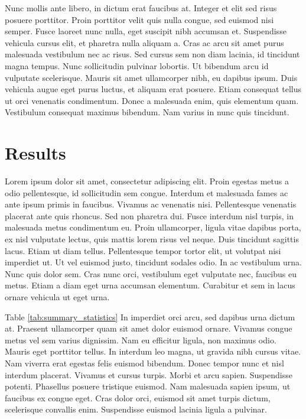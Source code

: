 \documentclass[12pt]{article}
\begin{document}
Nunc mollis ante libero, in dictum erat faucibus at. Integer et elit sed risus posuere porttitor. Proin porttitor velit quis nulla congue, sed euismod nisi semper. Fusce laoreet nunc nulla, eget suscipit nibh accumsan et. Suspendisse vehicula cursus elit, et pharetra nulla aliquam a. Cras ac arcu sit amet purus malesuada vestibulum nec ac risus. Sed cursus sem non diam lacinia, id tincidunt magna tempus. Nunc sollicitudin pulvinar lobortis. Ut bibendum arcu id vulputate scelerisque. Mauris sit amet ullamcorper nibh, eu dapibus ipsum. Duis vehicula augue eget purus luctus, et aliquam erat posuere. Etiam consequat tellus ut orci venenatis condimentum. Donec a malesuada enim, quis elementum quam. Vestibulum consequat maximus bibendum. Nam varius in nunc quis tincidunt.

\section{Results \label{sec:results}}

Lorem ipsum dolor sit amet, consectetur adipiscing elit. Proin egestas metus a odio pellentesque, id sollicitudin sem congue. Interdum et malesuada fames ac ante ipsum primis in faucibus. Vivamus ac venenatis nisi. Pellentesque venenatis placerat ante quis rhoncus. Sed non pharetra dui. Fusce interdum nisl turpis, in malesuada metus condimentum eu. Proin ullamcorper, ligula vitae dapibus porta, ex nisl vulputate lectus, quis mattis lorem risus vel neque. Duis tincidunt sagittis lacus. Etiam ut diam tellus. Pellentesque tempor tortor elit, ut volutpat nisi imperdiet ut. Ut vel euismod justo, tincidunt sodales odio. In ac vestibulum urna. Nunc quis dolor sem. Cras nunc orci, vestibulum eget vulputate nec, faucibus eu metus. Etiam a diam eget urna accumsan elementum. Curabitur et sem in lacus ornare vehicula ut eget urna.





Table \ref{tab:summary_statistics} In imperdiet orci arcu, sed dapibus urna dictum at. Praesent ullamcorper quam sit amet dolor euismod ornare. Vivamus congue metus vel sem varius dignissim. Nam eu efficitur ligula, non maximus odio. Mauris eget porttitor tellus. In interdum leo magna, ut gravida nibh cursus vitae. Nam viverra erat egestas felis euismod bibendum. Donec tempor nunc et nisl interdum placerat. Vivamus et cursus turpis. Morbi et arcu sapien. Suspendisse potenti. Phasellus posuere tristique euismod. Nam malesuada sapien ipsum, ut faucibus ex congue eget. Cras dolor orci, euismod sit amet turpis dictum, scelerisque convallis enim. Suspendisse euismod lacinia ligula a pulvinar.
\end{document}
